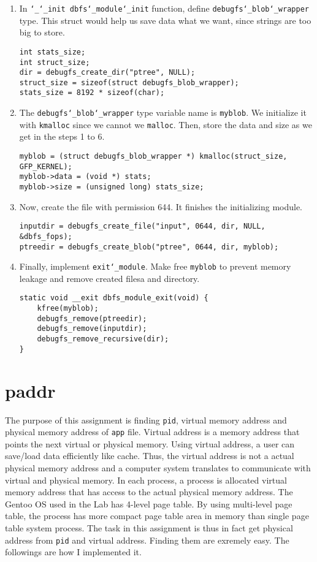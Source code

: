 \begin{enumerate}
\item In \texttt{\char`_\char`_init dbfs\char`_module\char`_init} function, define \texttt{debugfs\char`_blob\char`_wrapper} type.
This struct would help us save data what we want, since strings are too big to store.
\begin{lstlisting}
int stats_size;
int struct_size;
dir = debugfs_create_dir("ptree", NULL);
struct_size = sizeof(struct debugfs_blob_wrapper);
stats_size = 8192 * sizeof(char);
\end{lstlisting}

\item The \texttt{debugfs\char`_blob\char`_wrapper} type variable name is \texttt{myblob}.
We initialize it with \texttt{kmalloc} since we cannot we \texttt{malloc}.
Then, store the data and size as we get in the steps 1 to 6.
\begin{lstlisting}
myblob = (struct debugfs_blob_wrapper *) kmalloc(struct_size, GFP_KERNEL);
myblob->data = (void *) stats;
myblob->size = (unsigned long) stats_size;
\end{lstlisting}


\item Now, create the file with permission 644.
It finishes the initializing module.
\begin{lstlisting}
inputdir = debugfs_create_file("input", 0644, dir, NULL, &dbfs_fops);
ptreedir = debugfs_create_blob("ptree", 0644, dir, myblob);
\end{lstlisting}

\item Finally, implement \texttt{exit\char`_module}. Make free \texttt{myblob} to prevent memory leakage and remove created filesa and directory.
\begin{lstlisting}
static void __exit dbfs_module_exit(void) {
    kfree(myblob);
    debugfs_remove(ptreedir);
    debugfs_remove(inputdir);
    debugfs_remove_recursive(dir);
}
\end{lstlisting}
\end{enumerate}

\section{paddr}
The purpose of this assignment is finding \texttt{pid}, virtual memory address and physical memory address of \texttt{app} file.
Virtual address is a memory address that points the next virtual or physical memory.
Using virtual address, a user can save/load data efficiently like cache.
Thus, the virtual address is not a actual physical memory address and a computer system translates to communicate with virtual and physical memory.
In each process, a process is allocated virtual memory address that has access to the actual physical memory address.
The Gentoo OS used in the Lab has 4-level page table.
By using multi-level page table, the process has more compact page table area in memory than single page table system process.
The task in this assignment is thus in fact get physical address from \texttt{pid} and virtual address. Finding them are exremely easy.
The followings are how I implemented it.

